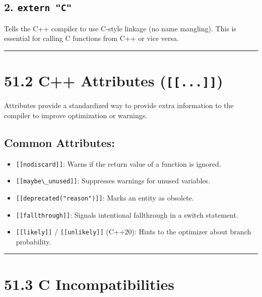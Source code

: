 \hypertarget{extern-c}{%
\subsection{\texorpdfstring{2.
\texttt{extern\ "C"}}{2. extern "C"}}\label{extern-c}}

Tells the C++ compiler to use C-style linkage (no name mangling). This
is essential for calling C functions from C++ or vice versa.

\begin{center}\rule{0.5\linewidth}{0.5pt}\end{center}

\hypertarget{c-attributes-...}{%
\section{\texorpdfstring{51.2 C++ Attributes
(\texttt{{[}{[}...{]}{]}})}{51.2 C++ Attributes ({[}{[}...{]}{]})}}\label{c-attributes-...}}

Attributes provide a standardized way to provide extra information to
the compiler to improve optimization or warnings.

\hypertarget{common-attributes}{%
\subsection{Common Attributes:}\label{common-attributes}}

\begin{itemize}
\tightlist
\item
  \passthrough{\lstinline![[nodiscard]]!}: Warns if the return value of
  a function is ignored.
\item
  \passthrough{\lstinline![[maybe\_unused]]!}: Suppresses warnings for
  unused variables.
\item
  \passthrough{\lstinline![[deprecated("reason")]]!}: Marks an entity as
  obsolete.
\item
  \passthrough{\lstinline![[fallthrough]]!}: Signals intentional
  fallthrough in a switch statement.
\item
  \passthrough{\lstinline![[likely]]!} /
  \passthrough{\lstinline![[unlikely]]!} (C++20): Hints to the optimizer
  about branch probability.
\end{itemize}

\begin{center}\rule{0.5\linewidth}{0.5pt}\end{center}

\hypertarget{c-incompatibilities}{%
\section{51.3 C Incompatibilities}\label{c-incompatibilities}}

